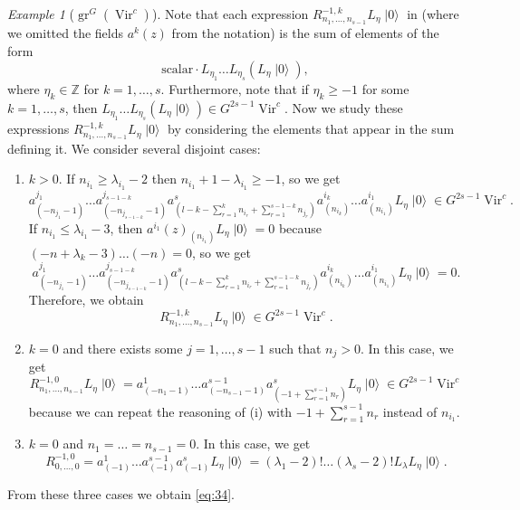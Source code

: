 \documentclass[a4paper, 12pt, reqno]{amsart}
\theoremstyle{remark}
\newtheorem{example}[theorem]{Example}
\numberwithin{equation}{subsection}
\DeclareMathOperator{\Vir}{Vir}
\DeclareMathOperator{\gr}{gr}
\DeclareMathOperator{\vac}{|0\rangle}
\begin{document}
\begin{example}[$\gr^G(\Vir^c)$]
  Note that each expression $R^{-1, k}_{n_1, \dots, n_{s - 1}}L_{\eta}\vac$ in  (where we omitted the fields $a^k(z)$ from the notation) is the sum of elements of the form
  \begin{equation*}
    \text{scalar}\cdot L_{\eta_1}\dots L_{\eta_s}(L_{\eta}\vac),
  \end{equation*}
  where $\eta_k \in \mathbb{Z}$ for $k = 1, \dots, s$.
  Furthermore, note that if $\eta_k \ge -1$ for some $k = 1, \dots, s$, then $L_{\eta_1}\dots L_{\eta_s}(L_{\eta}\vac) \in G^{2s - 1}\Vir^c$.
  Now we study these expressions $R^{-1, k}_{n_1, \dots, n_{s - 1}}L_{\eta}\vac$ by considering the elements that appear in the sum defining it.
  We consider several disjoint cases:
  \begin{enumerate}
  \item $k > 0$.
    If $n_{i_1} \ge \lambda_{i_1} - 2$ then $n_{i_1} + 1 - \lambda_{i_1} \ge -1$, so we get
    \begin{equation*}
      a^{j_1}_{(-n_{j_1} - 1)}\dots a^{j_{s - 1 - k}}_{(-n_{j_{s - 1 - k}} - 1)}a^s_{(l - k - \sum_{r = 1}^kn_{i_r} + \sum_{r = 1}^{s - 1 - k}n_{j_r})}a^{i_k}_{(n_{i_k})}\dots a^{i_1}_{(n_{i_1})}L_{\eta}\vac \in G^{2s - 1}\Vir^c.
    \end{equation*}
    If $n_{i_1} \le \lambda_{i_1} - 3$, then $a^{i_1}(z)_{(n_{i_1})}L_{\eta}\vac = 0$ because $(-n + \lambda_k - 3)\dots(-n) = 0$, so we get
    \begin{equation*}
      a^{j_1}_{(-n_{j_1} - 1)}\dots a^{j_{s - 1 - k}}_{(-n_{j_{s - 1 - k}} - 1)}a^s_{(l - k - \sum_{r = 1}^kn_{i_r} + \sum_{r = 1}^{s - 1 - k}n_{j_r})}a^{i_k}_{(n_{i_k})}\dots a^{i_1}_{(n_{i_1})}L_{\eta}\vac = 0.
    \end{equation*}
    Therefore, we obtain
    \begin{equation*}
      R^{-1, k}_{n_1, \dots, n_{s - 1}}L_{\eta}\vac \in G^{2s - 1}\Vir^c.
    \end{equation*}
  \item $k = 0$ and there exists some $j = 1, \dots, s - 1$ such that $n_j > 0$.
    In this case, we get
    \begin{equation*}
      R^{-1, 0}_{n_1, \dots, n_{s - 1}}L_{\eta}\vac = a^1_{(-n_1 - 1)}\dots a^{s - 1}_{(-n_{s - 1} - 1)}a^s_{(-1 + \sum_{r = 1}^{s - 1}n_r)}L_{\eta}\vac \in G^{2s - 1}\Vir^c
    \end{equation*}
    because we can repeat the reasoning of (i) with $-1 + \sum_{r = 1}^{s - 1}n_r$ instead of $n_{i_1}$.
  \item $k = 0$ and $n_1 = \dots = n_{s - 1} = 0$.
    In this case, we get
    \begin{equation*}
      R^{-1, 0}_{0, \dots, 0} = a^1_{(-1)}\dots a^{s - 1}_{(-1)}a^s_{(-1)} L_{\eta}\vac = (\lambda_1 - 2)!\dots(\lambda_s - 2)!L_{\lambda} L_{\eta}\vac.
    \end{equation*}
  \end{enumerate}
  From these three cases we obtain \eqref{eq:34}.


\end{example}
\end{document}
